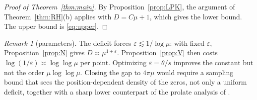 \documentclass[11pt]{amsart}
\theoremstyle{definition}
\theoremstyle{remark}
\newtheorem{remark}[proposition]{Remark}
\numberwithin{equation}{section}
\begin{document}
\begin{proof}[Proof of Theorem~\ref{thm:main}]
By Proposition~\ref{prop:LPK}, the argument of Theorem~\ref{thm:RH}(b) applies with $D=C\mu+1$, which gives the lower bound. The upper bound is \eqref{eq:upper}.
\end{proof}

\begin{remark}[parameters]
The deficit forces $\varepsilon\lesssim1/\log\mu$: with fixed $\varepsilon$, Proposition~\ref{prop:N} gives $D\asymp\mu^{1+\varepsilon}$. Proposition~\ref{prop:V} then costs $\log(1/\varepsilon)\asymp\log\log\mu$ per point. Optimizing $\varepsilon=\theta/s$ improves the constant but not the order $\mu\log\log\mu$. Closing the gap to $4\pi\mu$ would require a sampling bound that sees the position-dependent density of the zeros, not only a uniform deficit, together with a sharp lower counterpart of the prolate analysis of \cite{MoriWeilIII}.
\end{remark}
\end{document}
